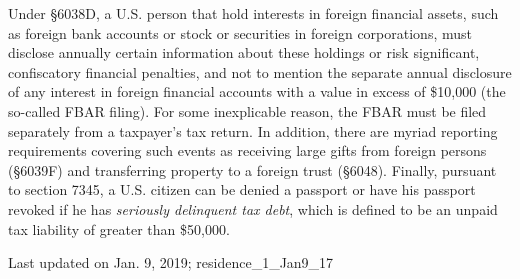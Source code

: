 \begin{enumerate}
	Under \S6038D, a U.S. person that hold interests in foreign financial assets, such as foreign bank accounts or stock or securities in foreign corporations, must disclose annually certain information about these holdings or risk significant, confiscatory financial penalties, and not to mention the separate annual disclosure of any interest in foreign financial accounts with a value in excess of \$10,000 (the so-called FBAR filing).  For some inexplicable reason, the FBAR must be filed separately from a taxpayer's tax return.  In addition, there are myriad reporting requirements covering such events as receiving large gifts from foreign persons (\S6039F) and transferring property to a foreign trust (\S6048).  Finally, pursuant to section 7345, a U.S. citizen can be denied a passport or have his passport revoked if he has \emph{seriously delinquent tax debt}, which is defined to be an unpaid tax liability of greater than \$50,000.    
	
\end{enumerate}




\begin{framed}
	Last updated on Jan. 9, 2019; residence\_1\_Jan9\_17
	\end{framed}





